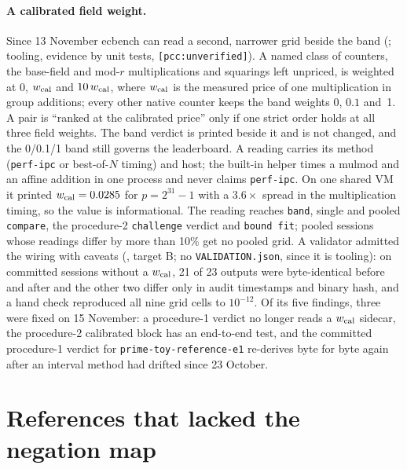 \paragraph{A calibrated field weight.} Since 13 November ecbench can read a
second, narrower grid beside the band
(; tooling, evidence by unit
tests, \texttt{[pcc:unverified]}). A named class of counters, the base-field
and mod-$r$ multiplications and squarings left unpriced, is weighted at $0$,
$w_{\rm cal}$ and $10\,w_{\rm cal}$, where $w_{\rm cal}$ is the measured price
of one multiplication in group additions; every other native counter keeps
the band weights $0$, $0.1$ and~1. A pair is ``ranked at the calibrated
price'' only if one strict order holds at all three field weights. The band
verdict is printed beside it and is not changed, and the 0/0.1/1 band still
governs the leaderboard. A reading carries its method (\texttt{perf-ipc} or
best-of-$N$ timing) and host; the built-in helper times a mulmod and an
affine addition in one process and never claims \texttt{perf-ipc}. On one
shared VM it printed $w_{\rm cal}=0.0285$ for $p=2^{31}-1$ with a $3.6\times$
spread in the multiplication timing, so the value is informational. The
reading reaches \texttt{band}, single and pooled \texttt{compare}, the
procedure-2 \texttt{challenge} verdict and \texttt{bound fit}; pooled
sessions whose readings differ by more than 10\% get no pooled grid. A
validator admitted the wiring with caveats
(, target B; no
\texttt{VALIDATION.json}, since it is tooling): on committed sessions without
a $w_{\rm cal}$, 21 of 23 outputs were byte-identical before and after and
the other two differ only in audit timestamps and binary hash, and a hand
check reproduced all nine grid cells to $10^{-12}$. Of its five findings,
three were fixed on 15 November: a procedure-1 verdict no longer reads a
$w_{\rm cal}$ sidecar, the procedure-2 calibrated block has an end-to-end
test, and the committed procedure-1 verdict for
\texttt{prime-toy-reference-e1} re-derives byte for byte again after an
interval method had drifted since 23 October.

\section{References that lacked the negation map}\label{sec:mr-negaudit}

